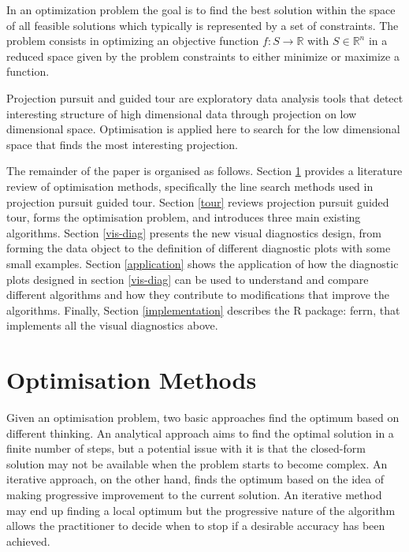 \documentclass[12pt]{article}
\begin{document}
In an optimization problem the goal is to find the best solution within
the space of all feasible solutions which typically is represented by a
set of constraints. The problem consists in optimizing an objective
function \(f: S \rightarrow \mathbb{R}\) with \(S \in \mathbb{R}^n\) in
a reduced space given by the problem constraints to either minimize or
maximize a function.

Projection pursuit and guided tour are exploratory data analysis tools
that detect interesting structure of high dimensional data through
projection on low dimensional space. Optimisation is applied here to
search for the low dimensional space that finds the most interesting
projection.

The remainder of the paper is organised as follows. Section \ref{optim}
provides a literature review of optimisation methods, specifically the
line search methods used in projection pursuit guided tour. Section
\ref{tour} reviews projection pursuit guided tour, forms the
optimisation problem, and introduces three main existing algorithms.
Section \ref{vis-diag} presents the new visual diagnostics design, from
forming the data object to the definition of different diagnostic plots
with some small examples. Section \ref{application} shows the
application of how the diagnostic plots designed in section
\ref{vis-diag} can be used to understand and compare different
algorithms and how they contribute to modifications that improve the
algorithms. Finally, Section \ref{implementation} describes the R
package: ferrn, that implements all the visual diagnostics above.

\newpage

\hypertarget{optim}{%
\section{Optimisation Methods}\label{optim}}

Given an optimisation problem, two basic approaches find the optimum
based on different thinking. An analytical approach aims to find the
optimal solution in a finite number of steps, but a potential issue with
it is that the closed-form solution may not be available when the
problem starts to become complex. An iterative approach, on the other
hand, finds the optimum based on the idea of making progressive
improvement to the current solution. An iterative method may end up
finding a local optimum but the progressive nature of the algorithm
allows the practitioner to decide when to stop if a desirable accuracy
has been achieved.
\end{document}
